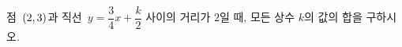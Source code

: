 점~$(2{,}\mkern3mu\mathopen{}3)$과 직선~$y=\dfrac{3}{4}x+\dfrac{k}{2}$ 사이의 거리가 $2$일 때, 모든 상수 $k$의 값의 합을 구하시오.

